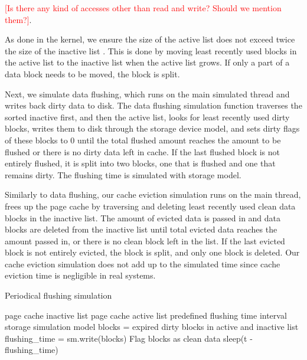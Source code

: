 \documentclass[conference]{IEEEtran}
\newcommand{\Desc}[2]{\State \makebox[2em][l]{#1}#2}
\begin{document}
			\textcolor{red}{[Is there any kind of accesses other than read and write? 
			Should we mention them?]}. 			
			
            As done in the kernel, we ensure the size of the active list does not 
            exceed twice the size of the inactive list 
			\cite{gorman2004understanding, linuxdev3rd2010}. 
			This is done by moving least recently used blocks in the active list 
			to the inactive list when the active list grows. If only a part of a data 
			block needs to be moved, the block is split.

			Next, we simulate data flushing, which runs on the main simulated 
			thread and writes back dirty data to disk. 
			The data flushing simulation function traverses the sorted inactive first, 
			and then the active list, looks for least recently used dirty blocks, 
			writes them to disk through the storage device model, and 
			sets dirty flags of these blocks to 0 until the total flushed amount 
			reaches the amount to be flushed or there is no dirty data left in cache. 
			If the last flushed block is not entirely flushed, it is split into 
			two blocks, one that is flushed and one that remains dirty.
			The flushing time is simulated with storage model.
				
			Similarly to data flushing, our cache eviction simulation runs on 
			the main thread, frees up the page cache by traversing and deleting 
			least recently used clean data blocks in the inactive list.
			The amount of evicted data is passed in and data blocks are deleted 
			from the inactive list until total evicted data reaches the amount 
			passed in, or there is no clean block left in the list.
			If the last evicted block is not entirely evicted, the block is split, 
			and only one block is deleted.
			Our cache eviction simulation does not add up to the simulated time 
			since cache eviction time is negligible in real systems.		
			
			\begin{algorithm}\caption{Periodical flushing simulation}\label{alg:pdflush}
				\small
				\begin{algorithmic}[1]
					\Input
        				\Desc{in}{page cache inactive list}
        				\Desc{ac}{page cache active list}
						\Desc{t}{predefined flushing time interval}
						\Desc{sm}{storage simulation model}
   					\EndInput
						\State blocks = expired dirty blocks in active and inactive list
						\State flushing\_time = sm.write(blocks)
						\State Flag blocks as clean data
							\State sleep(t - flushing\_time)
						\EndIf
					\EndWhile
				\end{algorithmic}
			\end{algorithm}				
			
\end{document}
